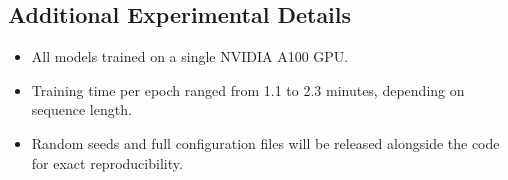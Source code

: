 \subsection{Additional Experimental Details}
\label{sec:extra-exp}

\begin{itemize}[leftmargin=1.5em]
	\item All models trained on a single NVIDIA A100 GPU.
	\item Training time per epoch ranged from 1.1 to 2.3 minutes, depending on sequence length.
	\item Random seeds and full configuration files will be released alongside the code for exact reproducibility.
\end{itemize}

